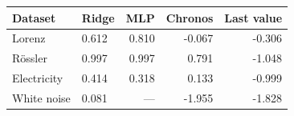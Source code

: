 \begin{tabular}{llrrr}
\toprule
Dataset & Ridge & MLP & Chronos & Last value \\
\midrule
Lorenz & 0.612 & 0.810 & -0.067 & -0.306 \\
R\"ossler & 0.997 & 0.997 & 0.791 & -1.048 \\
Electricity & 0.414 & 0.318 & 0.133 & -0.999 \\
White noise & 0.081 & --- & -1.955 & -1.828 \\
\bottomrule
\end{tabular}
